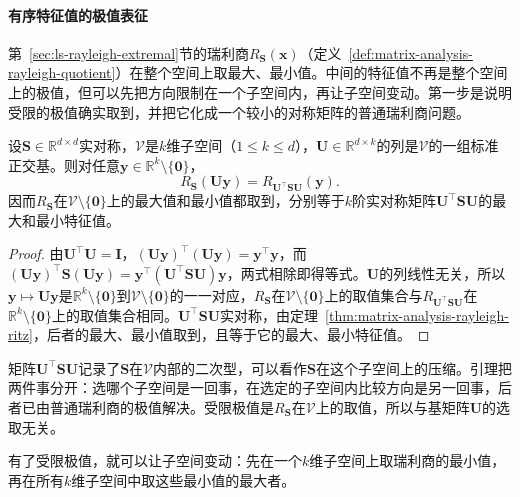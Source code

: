 \paragraph{有序特征值的极值表征}

第~\ref{sec:ls-rayleigh-extremal}节的瑞利商$R_{\bm S}(\bm x)$（定义~\ref{def:matrix-analysis-rayleigh-quotient}）在整个空间上取最大、最小值。中间的特征值不再是整个空间上的极值，但可以先把方向限制在一个子空间内，再让子空间变动。第一步是说明受限的极值确实取到，并把它化成一个较小的对称矩阵的普通瑞利商问题。

\begin{lemma}[子空间上的瑞利商极值]
\label{lem:ls-restricted-rayleigh}
设$\bm S\in\mathbb R^{d\times d}$实对称，$\mathcal V$是$k$维子空间（$1\leq k\leq d$），$\bm U\in\mathbb R^{d\times k}$的列是$\mathcal V$的一组标准正交基。则对任意$\bm y\in\mathbb R^k\setminus\{\bm0\}$，
\[
 R_{\bm S}(\bm U\bm y)=R_{\bm U^\top\bm S\bm U}(\bm y).
\]
因而$R_{\bm S}$在$\mathcal V\setminus\{\bm0\}$上的最大值和最小值都取到，分别等于$k$阶实对称矩阵$\bm U^\top\bm S\bm U$的最大和最小特征值。
\end{lemma}
\begin{proof}
由$\bm U^\top\bm U=\bm I$，$(\bm U\bm y)^\top(\bm U\bm y)=\bm y^\top\bm y$，而$(\bm U\bm y)^\top\bm S(\bm U\bm y)=\bm y^\top(\bm U^\top\bm S\bm U)\bm y$，两式相除即得等式。$\bm U$的列线性无关，所以$\bm y\mapsto\bm U\bm y$是$\mathbb R^k\setminus\{\bm0\}$到$\mathcal V\setminus\{\bm0\}$的一一对应，$R_{\bm S}$在$\mathcal V\setminus\{\bm0\}$上的取值集合与$R_{\bm U^\top\bm S\bm U}$在$\mathbb R^k\setminus\{\bm0\}$上的取值集合相同。$\bm U^\top\bm S\bm U$实对称，由定理~\ref{thm:matrix-analysis-rayleigh-ritz}，后者的最大、最小值取到，且等于它的最大、最小特征值。
\end{proof}
矩阵$\bm U^\top\bm S\bm U$记录了$\bm S$在$\mathcal V$内部的二次型，可以看作$\bm S$在这个子空间上的压缩。引理把两件事分开：选哪个子空间是一回事，在选定的子空间内比较方向是另一回事，后者已由普通瑞利商的极值解决。受限极值是$R_{\bm S}$在$\mathcal V$上的取值，所以与基矩阵$\bm U$的选取无关。

有了受限极值，就可以让子空间变动：先在一个$k$维子空间上取瑞利商的最小值，再在所有$k$维子空间中取这些最小值的最大者。

